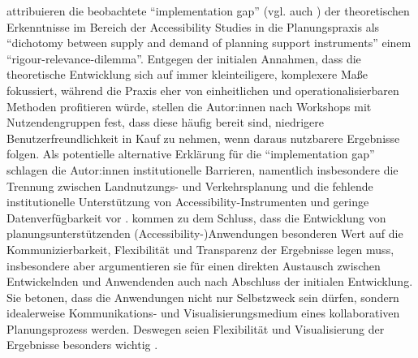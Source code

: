 \documentclass[11pt,pdftex,a4paper]{scrartcl}
\begin{document}
	\textcite[135]{silvaAccessibilityInstrumentsPlanning2017} attribuieren die beobachtete \enquote{implementation gap} (vgl. auch \textcite[12]{pajaresAccessibilityProximityAddressing2021}) der theoretischen Erkenntnisse im Bereich der Accessibility Studies in die Planungspraxis als \enquote{dichotomy between supply and demand of planning support instruments} einem \enquote{rigour-relevance-dilemma}.
	Entgegen der initialen Annahmen, dass die theoretische Entwicklung sich auf immer kleinteiligere, komplexere Maße fokussiert, während die Praxis eher von einheitlichen und operationalisierbaren Methoden profitieren würde, stellen die Autor:innen nach Workshops mit Nutzendengruppen fest, dass diese häufig bereit sind, niedrigere Benutzerfreundlichkeit in Kauf zu nehmen, wenn daraus nutzbarere Ergebnisse folgen. Als potentielle alternative Erklärung für die \enquote{implementation gap} schlagen die Autor:innen institutionelle Barrieren, namentlich insbesondere die Trennung zwischen Landnutzungs- und Verkehrsplanung und die fehlende institutionelle Unterstützung von Accessibility-Instrumenten und geringe Datenverfügbarkeit vor \parencite[142f]{silvaAccessibilityInstrumentsPlanning2017}. \textcite{papaLearningProcessAccessibility2017} kommen zu dem Schluss, dass die Entwicklung von planungsunterstützenden (Accessibility-)Anwendungen besonderen Wert auf die Kommunizierbarkeit, Flexibilität und Transparenz der Ergebnisse legen muss, insbesondere aber argumentieren sie für einen direkten Austausch zwischen Entwickelnden und Anwendenden auch nach Abschluss der initialen Entwicklung. Sie betonen, dass die Anwendungen nicht nur Selbstzweck sein dürfen, sondern idealerweise Kommunikations- und Visualisierungsmedium eines kollaborativen Planungsprozess werden. Deswegen seien Flexibilität und Visualisierung der Ergebnisse besonders wichtig \parencite[vgl.][117ff]{papaLearningProcessAccessibility2017}.
	
\end{document}
